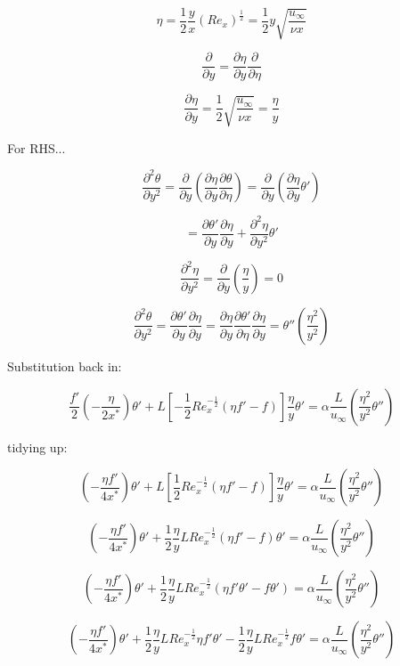\documentclass[11pt]{article}
\begin{document}
$$\eta = \frac{1}{2} \frac{y}{x} (Re_x)^{\frac{1}{2}} = \frac{1}{2} y \sqrt{\frac{u_\infty}{\nu x}}$$

$$\frac{\partial}{\partial y} = \frac{\partial \eta}{\partial y} \frac{\partial }{\partial \eta}$$

$$\frac{\partial \eta}{\partial y}= \frac{1}{2} \sqrt{\frac{u_\infty}{\nu x}} = \frac{\eta}{y}$$

For RHS...

$$\frac{\partial ^2 \theta}{\partial y^2} = \frac{\partial}{\partial y} (\frac{\partial  \eta}{\partial y} \frac{\partial \theta}{\partial \eta}) = \frac{\partial}{\partial y} (\frac{\partial  \eta}{\partial y} \theta') $$ 

$$ = \frac{\partial \theta' }{\partial y} \frac{\partial \eta }{\partial y} + \frac{\partial^2 \eta}{\partial y^2} \theta'$$

$$\frac{\partial^2 \eta}{\partial y^2} = \frac{\partial }{\partial y} (\frac{\eta}{y}) = 0 $$

$$\frac{\partial ^2 \theta}{\partial y^2} = \frac{\partial \theta' }{\partial y} \frac{\partial \eta }{\partial y} =  \frac{\partial \eta}{\partial y} \frac{\partial \theta'}{\partial \eta} \frac{\partial \eta }{\partial y} = \theta'' (\frac{\eta^2}{y^2})$$ 

Substitution back in:

$$\frac{f'}{2} ( - \frac{\eta}{2x^*}) \theta' + L \left[ -\frac{1}{2}  Re_x^{-\frac{1}{2}} (\eta f' -f) \right] \frac{\eta }{ y} \theta'   = \alpha \frac{L}{u_\infty} ( \frac{\eta^2 }{y^2} \theta'' ) $$ 

tidying up:


$$( - \frac{\eta f'}{4x^*}) \theta' + L \left[ \frac{1}{2}  Re_x^{-\frac{1}{2}} (\eta f' -f) \right] \frac{\eta }{ y} \theta'   = \alpha \frac{L}{u_\infty} ( \frac{\eta^2 }{y^2} \theta'' ) $$ 

$$( - \frac{\eta f'}{4x^*}) \theta'   +\frac{1}{2} \frac{\eta }{ y} L   Re_x^{-\frac{1}{2}} (\eta f' -f) \theta'    = \alpha \frac{L}{u_\infty} ( \frac{\eta^2 }{y^2} \theta'' ) $$ 

$$( - \frac{\eta f'}{4x^*}) \theta'   +\frac{1}{2} \frac{\eta }{ y} L   Re_x^{-\frac{1}{2}} (\eta f'  \theta' -f  \theta')    = \alpha \frac{L}{u_\infty} ( \frac{\eta^2 }{y^2} \theta'' ) $$ 

$$( - \frac{\eta f'}{4x^*}) \theta'  +\frac{1}{2} \frac{\eta }{ y} L   Re_x^{-\frac{1}{2}} \eta f'  \theta' - \frac{1}{2} \frac{\eta }{ y} L   Re_x^{-\frac{1}{2}}  f  \theta'   = \alpha \frac{L}{u_\infty} ( \frac{\eta^2 }{y^2} \theta'' ) $$ 
\end{document}
